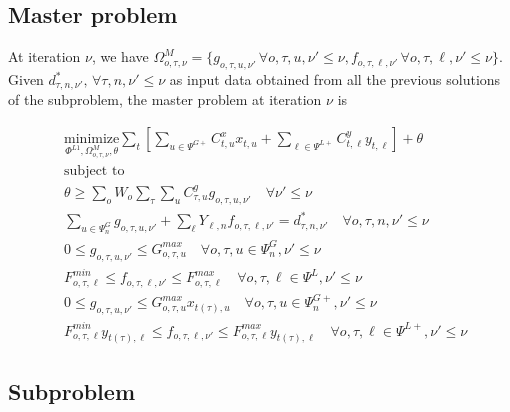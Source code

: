 \subsection{Master problem}

At iteration $\nu$, we have $\Omega_{o, \tau, \nu}^{M} = \{ g_{o, \tau, u, \nu'} \, \forall o, \tau, u, \nu' \leq \nu, f_{o, \tau, \ell, \nu'} \, \forall o, \tau, \ell, \nu' \leq \nu \}$. Given $d_{\tau, n, \nu'}^*, \, \forall \tau, n, \nu' \leq \nu$ as input data obtained from all the previous solutions of the subproblem, the master problem at iteration $\nu$ is

\begin{align}
&\label{master_obj} \underset{\Phi^{L1}, \Omega_{o, \tau, \nu}^{M}, \theta}{\text{minimize}} \sum\limits_{t} \left[ \sum\limits_{u \in \Psi^{G+}} C^x_{t, u} x_{t, u} + \sum\limits_{\ell \in \Psi^{L+}} C^y_{t, \ell} y_{t, \ell} \right] + \theta \\
&\text{subject to} \nonumber \\
&\theta \geq \sum\limits_o W_o \sum\limits_{\tau} \sum\limits_{u} C_{\tau, u}^g g_{o, \tau, u, \nu'} \quad \forall \nu' \leq \nu \\
&\sum\limits_{u \in \Psi^G_{n}} g_{o, \tau, u, \nu'} + \sum\limits_{\ell} Y_{\ell, n} f_{o, \tau, \ell, \nu'} = d_{\tau, n, \nu'}^* \quad \forall o, \tau, n, \nu' \leq \nu \\
&0 \leq g_{o, \tau, u, \nu'} \leq G_{o, \tau, u}^{max} \quad \forall o, \tau, u \in \Psi_n^G, \nu' \leq \nu \\
&F_{o, \tau, \ell}^{min} \leq f_{o, \tau, \ell, \nu'} \leq F_{o, \tau, \ell}^{max} \quad \forall o, \tau, \ell \in \Psi^L, \nu' \leq \nu \\
&0 \leq g_{o, \tau, u, \nu'} \leq G_{o, \tau, u}^{max} x_{t(\tau), u} \quad \forall o, \tau, u \in \Psi_n^{G+}, \nu' \leq \nu \\
&F_{o, \tau, \ell}^{min} y_{t(\tau), \ell} \leq f_{o, \tau, \ell, \nu'} \leq F_{o, \tau, \ell}^{max} y_{t(\tau), \ell} \quad \forall o, \tau, \ell \in \Psi^{L+}, \nu' \leq \nu
\end{align}

\subsection{Subproblem}

